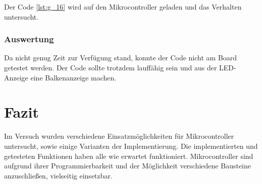 \documentclass[12pt,a4paper]{article}
\begin{document}
Der Code \ref{lst:g_16} wird auf den Mikrocontroller geladen und das Verhalten untersucht.

\subsubsection*{Auswertung}

Da nicht genug Zeit zur Verfügung stand, konnte der Code nicht am Board getestet werden. Der Code sollte trotzdem lauffähig sein und aus der LED-Anzeige eine Balkenanzeige machen.

\section{Fazit}

Im Versuch wurden verschiedene Einsatzmöglichkeiten für Mikrocontroller untersucht, sowie einige Varianten der Implementierung. Die implementierten und getesteten Funktionen haben alle wie erwartet funktioniert. Mikrocontroller sind aufgrund ihrer Programmierbarkeit und der Möglichkeit verschiedene Bausteine anzuschließen, vielseitig einsetzbar.
\end{document}
